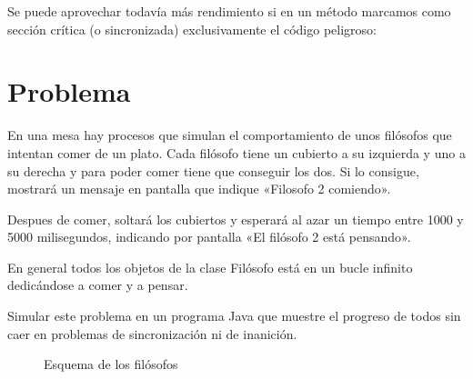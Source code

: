 \documentclass[letterpaper,10pt,spanish]{sphinxmanual}
\begin{document}
Se puede aprovechar todavía más rendimiento si en un método marcamos como sección crítica (o sincronizada) exclusivamente el código peligroso:

%
\begin{sphinxVerbatim}[commandchars=\\\{\}]
   
                 
\end{sphinxVerbatim}


\section{Problema}
\label{\detokenize{textos/tema2:problema}}
En una mesa hay procesos que simulan el comportamiento de unos filósofos que intentan comer de un plato. Cada filósofo tiene un cubierto a su izquierda y uno a su derecha y para poder comer tiene que conseguir los dos. Si lo consigue, mostrará un mensaje en pantalla que indique «Filosofo 2 comiendo».

Despues de comer, soltará los cubiertos y esperará al azar un tiempo entre 1000 y 5000 milisegundos, indicando por pantalla «El filósofo 2 está pensando».

En general todos los objetos de la clase Filósofo está en un bucle infinito dedicándose a comer y a pensar.

Simular este problema en un programa Java que muestre el progreso de todos sin caer en problemas de sincronización ni de inanición.

\begin{figure}[htbp]
\centering
\capstart

\noindent{}
\caption{Esquema de los filósofos}\label{\detokenize{textos/tema2:id3}}\end{figure}
\end{document}
